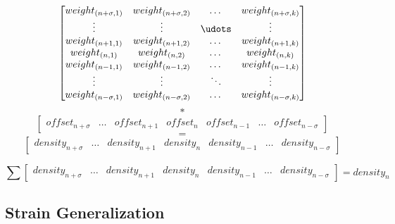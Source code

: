 \documentclass{article}
\begin{document}
\[ 	
\begin{bmatrix}
	weight_{(n+\sigma,1)} & weight_{(n+\sigma,2)} & \dots  & weight_{(n+\sigma,k)} \\
	\vdots & \vdots & \udots & \vdots \\
	weight_{(n+1,1)} & weight_{(n+1,2)} & \dots  & weight_{(n+1,k)} \\
	weight_{(n,1)} & weight_{(n,2)} & \dots  & weight_{(n,k)} \\
    weight_{(n-1,1)} & weight_{(n-1,2)} & \dots  & weight_{(n-1,k)} \\
    \vdots & \vdots & \ddots & \vdots \\
    weight_{(n-\sigma,1)} & weight_{(n-\sigma,2)} & \dots  & weight_{(n-\sigma,k)}
\end{bmatrix}
\]
$$ * $$
\[
\begin{bmatrix}
	offset_{n+\sigma} & \dots & offset_{n+1} & offset_{n} & offset_{n-1} & \dots & offset_{n-\sigma} 
\end{bmatrix}
\]
$$ = $$
\[
\begin{bmatrix}
	density_{n+\sigma} & \dots & density_{n+1} & density_{n} & density_{n-1} & \dots & density_{n-\sigma} 
\end{bmatrix}
\]

$$ \sum
\begin{bmatrix}
	density_{n+\sigma} & \dots & density_{n+1} & density_{n} & density_{n-1} & \dots & density_{n-\sigma} 
\end{bmatrix}
= density_n
$$ 

\subsection{Strain Generalization}
\end{document}
